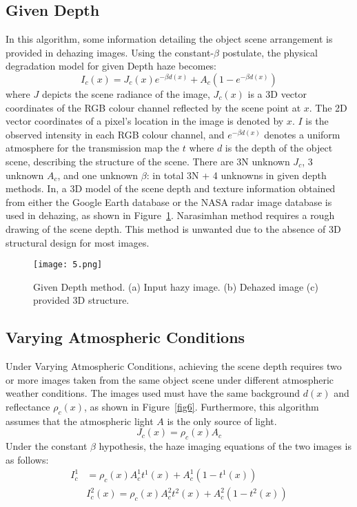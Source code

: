 \documentclass[doctor,english,listoffigures,listoftables]{thesis-uestc}
\begin{document}
\subsection{Given Depth}
In this algorithm, some information detailing the object scene arrangement is provided in dehazing images. Using the constant-$\beta$ postulate, the physical degradation model for given Depth haze becomes: 
\begin{equation}\label{scattering}
	I_c (x)= J_c (x)e^{-\beta d(x)} + A_c (1- e^{-\beta d(x)})
\end{equation}
where $J$ depicts the scene radiance of the image, $J_c (x)$ is a 3D vector coordinates of the RGB colour channel reflected by the scene point at $x$. The 2D vector coordinates of a pixel's location in the image is denoted by $x$. $I$ is the observed intensity in each RGB colour channel, and $e^{-\beta d(x)}$ denotes a uniform atmosphere for the transmission map the $t$ where $d$ is the depth of the object scene, describing the structure of the scene. There are 3N unknown $J_c$, 3 unknown $A_c$, and one unknown $\beta$: in total 3N + 4 unknowns in given depth methods. In, a 3D model of the scene depth and texture information obtained from either the Google Earth database or the NASA radar image database is used in dehazing, as shown in Figure~\ref{fig5}. Narasimhan method requires a rough drawing of the scene depth. This method is unwanted due to the absence of 3D structural design for most images. 
\begin{figure}[H]
	\centering
	\texttt{[image: 5.png]}
	\caption{ Given Depth method. (a) Input hazy image. (b) Dehazed image (c) provided 3D structure.}
	\label{fig5}
\end{figure}
\subsection{Varying Atmospheric Conditions}
Under Varying Atmospheric Conditions, achieving the scene depth requires two or more images taken from the same object scene under different atmospheric weather conditions. The images used must have the same background $d(x)$ and reflectance $\rho_c(x)$, as shown in Figure~\ref{fig6}. Furthermore, this algorithm assumes that the atmospheric light $A$ is the only source of light. 
\begin{equation} \label{eq1}
	J_c(x) = \rho_c(x)A_c
\end{equation}
Under the constant $\beta$ hypothesis, the haze imaging equations of the two images is as follows:
\begin{equation} \label{eq1}
	\begin{split}
		I_c^1 & = \rho _c (x)A_c^1 t^1(x) +A_c^1(1-t^1 (x)) \\
		& I_c^2 (x) = \rho _c (x)A_c^2 t^2(x) +A_c^2(1-t^2 (x))
	\end{split}
\end{equation}
\end{document}
